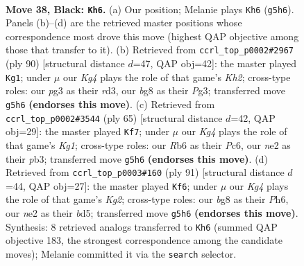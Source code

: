 \documentclass[11pt]{article}
\begin{document}
\clearpage

\begin{figure}[p]\centering
\begin{subfigure}{0.46\textwidth}\centering
\resizebox{\linewidth}{!}{%
\newchessgame
\chessboard[
  setfen={6B1/p7/br1p4/2p3k1/2P1r3/6P1/4NR1K/R7 b - - 3 38},
  showmover=false,
  pgfstyle=straightmove, color=movearrow, markmove={g5-h6}
]}
\caption{}
\end{subfigure}\hfill
\begin{subfigure}{0.46\textwidth}\centering
\resizebox{\linewidth}{!}{%
\newchessgame
\chessboard[
  setfen={5k2/5p2/7p/3b1R1B/7P/3r2P1/5P1K/8 w - - 18 46},
  showmover=false,
  pgfstyle=straightmove, color=movearrow, markmove={h2-g1}
]}
\caption{}
\end{subfigure}
\\[4pt]
\begin{subfigure}{0.46\textwidth}\centering
\resizebox{\linewidth}{!}{%
\newchessgame
\chessboard[
  setfen={6k1/6b1/2p3p1/1r1p2P1/3P4/1PR2N2/5P2/6K1 b - - 2 33},
  showmover=false,
  pgfstyle=straightmove, color=movearrow, markmove={g8-f7}
]}
\caption{}
\end{subfigure}\hfill
\begin{subfigure}{0.46\textwidth}\centering
\resizebox{\linewidth}{!}{%
\newchessgame
\chessboard[
  setfen={8/R2br1k1/1r1p3p/2pB1P2/8/3P4/6P1/2R3K1 b - - 0 46},
  showmover=false,
  pgfstyle=straightmove, color=movearrow, markmove={g7-f6}
]}
\caption{}
\end{subfigure}
\caption{\textbf{Move 38, Black: \texttt{Kh6}.} (a) Our position; Melanie plays \texttt{Kh6} (\texttt{g5h6}). Panels (b)--(d) are the retrieved master positions whose correspondence most drove this move (highest QAP objective among those that transfer to it). (b) Retrieved from \texttt{ccrl\_top\_p0002\#2967} (ply 90) [structural distance $d$=47, QAP obj=42]: the master played \texttt{Kg1}; under $\mu$ our \emph{Kg4} plays the role of that game's \emph{Kh2}; cross-type roles: our \emph{p}g3 as their \emph{r}d3, our \emph{b}g8 as their \emph{P}g3; transferred move \texttt{g5h6} \textbf{(endorses this move)}. (c) Retrieved from \texttt{ccrl\_top\_p0002\#3544} (ply 65) [structural distance $d$=42, QAP obj=29]: the master played \texttt{Kf7}; under $\mu$ our \emph{Kg4} plays the role of that game's \emph{Kg1}; cross-type roles: our \emph{R}b6 as their \emph{P}c6, our \emph{n}e2 as their \emph{p}b3; transferred move \texttt{g5h6} \textbf{(endorses this move)}. (d) Retrieved from \texttt{ccrl\_top\_p0003\#160} (ply 91) [structural distance $d$=44, QAP obj=27]: the master played \texttt{Kf6}; under $\mu$ our \emph{Kg4} plays the role of that game's \emph{Kg2}; cross-type roles: our \emph{b}g8 as their \emph{P}h6, our \emph{n}e2 as their \emph{b}d5; transferred move \texttt{g5h6} \textbf{(endorses this move)}. Synthesis: 8 retrieved analogs transferred to \texttt{Kh6} (summed QAP objective 183, the strongest correspondence among the candidate moves); Melanie committed it via the \texttt{search} selector.}
\label{fig:thought-m75}
\end{figure}
\end{document}
